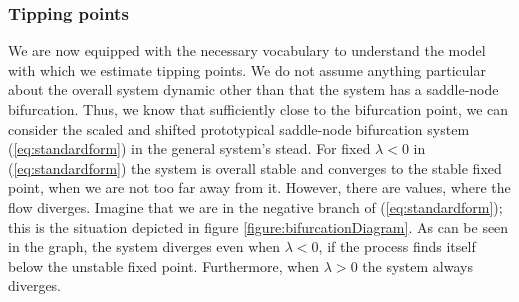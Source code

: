 \subsubsection{Tipping points}
We are now equipped with the necessary vocabulary to understand the model with which we estimate tipping points. We do not assume anything particular about the overall system dynamic other than that the system has a saddle-node bifurcation. Thus, we know that sufficiently close to the bifurcation point, we can consider the scaled and shifted prototypical saddle-node bifurcation system (\ref{eq:standardform}) in the general system's stead. For fixed $\lambda < 0$ in (\ref{eq:standardform}) the system is overall stable and converges to the stable fixed point, when we are not too far away from it. However, there are values, where the flow  diverges. Imagine that we are in the negative branch of (\ref{eq:standardform}); this is the situation depicted in figure \ref{figure:bifurcationDiagram}. As can be seen in the graph, the system diverges even when $\lambda<0$, if the process finds itself below the unstable fixed point. Furthermore, when $\lambda>0$ the system always diverges.

